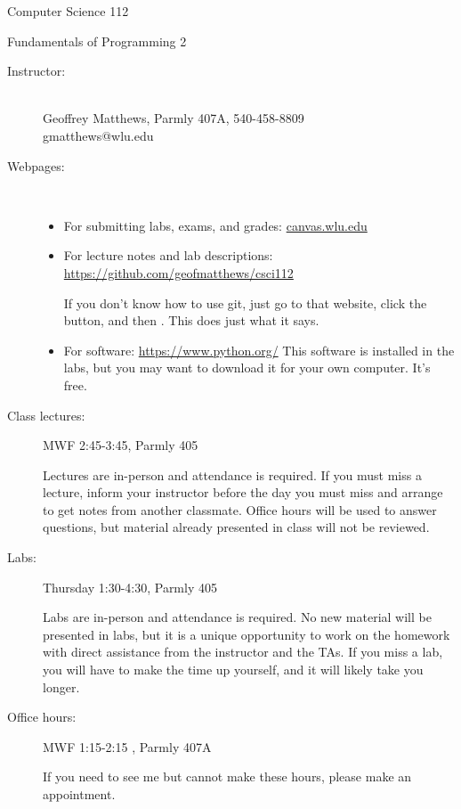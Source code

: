 \documentclass[12pt]{article}
\begin{document}
\centerline{\Large Computer Science 112}
\centerline{\large Fundamentals of Programming 2}

\begin{description}
\item[Instructor:]
~\\ Geoffrey Matthews, Parmly 407A, 540-458-8809
\\ gmatthews@wlu.edu


\item[Webpages:]~
\begin{itemize}
\item For submitting labs, exams, and grades: \url{canvas.wlu.edu}
\item For lecture notes and lab descriptions: \\
\url{https://github.com/geofmatthews/csci112}

If you don't know how to use git, just go to that website,
click the  button, and then .
This does just what it says.
\item For software: \url{https://www.python.org/}
This software is installed in the labs, but you may want to
download it for your own computer.  It's free.

\end{itemize}
\item[Class lectures:]  MWF 2:45-3:45, Parmly 405

Lectures are in-person and attendance is required.  If you must miss a
lecture, inform your instructor before the day you must miss
and arrange to get notes from another classmate.  Office hours
will be used to answer questions, but material already presented
in class will not be reviewed.

\item[Labs:]  Thursday 1:30-4:30,  Parmly 405

Labs are in-person and attendance is required.
No new material will be presented in labs, but it is a 
unique opportunity to work on the homework with direct 
assistance from the instructor and the TAs.  If you miss
a lab, you will have to make the time up yourself, and it
will likely take you longer.

\item[Office hours:] MWF 1:15-2:15 , Parmly 407A

If you need to see me but
cannot make these hours, please  make an appointment.


\end{description}
\end{document}
